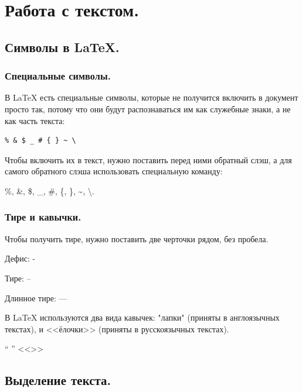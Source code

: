 \documentclass[12pt]{article}
\begin{document}
\section{Работа с текстом.}

\subsection{Символы в \LaTeX{}.} 

\subsubsection{Специальные символы.} В \LaTeX{} есть специальные символы, которые не получится включить в документ просто так, потому что они будут распознаваться им как служебные знаки, а не как часть текста: 

\begin{center}
\begin{BVerbatim}
% & $ _ # { } ~ \
\end{BVerbatim}
\end{center}

 Чтобы включить их в текст, нужно поставить перед ними обратный слэш, а для самого обратного слэша использовать специальную команду: 
 
 \begin{LTXexample}
 \%, \&, \$, \_, \#, \{, \}, \~{},
  \textbackslash{}.
  \end{LTXexample}

\subsubsection{Тире и кавычки.}

Чтобы получить тире, нужно поставить две черточки рядом, без пробела. 

Дефис: -

Тире: --

Длинное тире: ---

В \LaTeX{} используются два вида кавычек: "лапки" (приняты в англоязычных текстах), и <<ёлочки>> (приняты в русскоязычных текстах). 

 \begin{LTXexample}
`` '' 
<<>> 
  \end{LTXexample}

\subsection{Выделение текста.}
\end{document}
